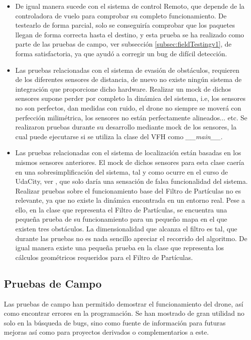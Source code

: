 \begin{itemize}
\item De igual manera sucede con el sistema de control Remoto, que depende de la controladora de vuelo para comprobar su completo funcionamiento. De testearlo de forma parcial, solo se conseguiría comprobar que los paquetes llegan de forma correcta hasta el destino, y esta prueba se ha realizado como parte de las pruebas de campo, ver subsección \ref{subsec:fieldTestingv1}, de forma satisfactoria, ya que ayudó a corregir un bug de difícil detección.
\item Las pruebas relacionadas con el sistema de evasión de obstáculos, requieren de los diferentes sensores de distancia, de nuevo no existe ningún sistema de integración que proporcione dicho hardware. Realizar un mock de dichos sensores supone perder por completo la dinámica del sistema, i.e, los sensores no son perfectos, dan medidas con ruido, el drone no siempre se moverá con perfección milimétrica, los sensores no están perfectamente alineados... etc. Se realizaron pruebas durante su desarrollo mediante mock de los sensores, la cual puede ejecutarse si se utiliza la clase del VFH como \emph{\_\_main\_\_}.
\item Las pruebas relacionadas con el sistema de localización están basadas en los mismos sensores anteriores. El mock de dichos sensores para esta clase caería en una sobresimplificación del sistema, tal y como ocurre en el curso de UdaCity, ver \citep{wiki:UdCityPF}, que solo daría una sensación de falsa funcionalidad del sistema. Realizar pruebas sobre el funcionamiento base del Filtro de Partículas no es relevante, ya que no existe la dinámica encontrada en un entorno real. Pese a ello, en la clase que representa el Filtro de Partículas, se encuentra una pequeña prueba de su funcionamiento para un pequeño mapa en el que existen tres obstáculos. La dimensionalidad que alcanza el filtro es tal, que durante las pruebas no es nada sencillo apreciar el recorrido del algoritmo. De igual manera existe una pequeña prueba en la clase que representa los cálculos geométricos requeridos para el Filtro de Partículas.
\end{itemize}


\subsection{Pruebas de Campo}

Las pruebas de campo han permitido demostrar el funcionamiento del drone, así como encontrar errores en la programación. Se han mostrado de gran utilidad no solo en la búsqueda de bugs, sino como fuente de información para futuras mejoras así como para proyectos derivados o complementarios a este.

